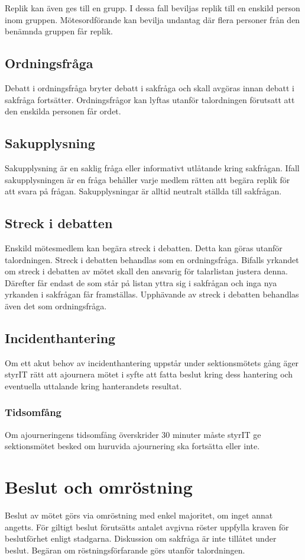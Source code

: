 \documentclass[11pt, includeaddress]{classes/cthit}
\begin{document}
Replik kan även ges till en grupp. I dessa fall beviljas replik till en enskild person inom gruppen.
Mötesordförande kan bevilja undantag där flera personer från den benämnda gruppen får replik.

\subsection{Ordningsfråga}
Debatt i ordningsfråga bryter debatt i sakfråga och skall avgöras innan debatt i sakfråga fortsätter.
Ordningsfrågor kan lyftas utanför talordningen förutsatt att den enskilda personen får ordet.
\subsection{Sakupplysning}
Sakupplysning är en saklig fråga eller informativt utlåtande kring sakfrågan. Ifall sakupplysningen är en fråga behåller varje medlem rätten att begära replik för att svara på frågan.
Sakupplysningar är alltid neutralt ställda till sakfrågan.
\subsection{Streck i debatten}
Enskild mötesmedlem kan begära streck i debatten.
Detta kan göras utanför talordningen.
Streck i debatten behandlas som en ordningsfråga. Bifalls yrkandet om streck i debatten av mötet skall den ansvarig för talarlistan justera denna.
Därefter får endast de som står på listan yttra sig i sakfrågan och inga nya yrkanden i sakfrågan får framställas.
Upphävande av streck i debatten behandlas även det som ordningsfråga.
\subsection{Incidenthantering}
Om ett akut behov av incidenthantering uppstår under sektionsmötets gång äger styrIT rätt att ajournera mötet i syfte att fatta beslut kring dess hantering och eventuella uttalande kring hanterandets resultat.
\subsubsection{Tidsomfång}
Om ajourneringens tidsomfång överskrider 30 minuter måste styrIT ge sektionsmötet besked om huruvida ajournering ska fortsätta eller inte.
\section{Beslut och omröstning}
Beslut av mötet görs via omröstning med enkel majoritet, om inget annat angetts. För giltigt beslut förutsätts antalet avgivna röster uppfylla kraven för beslutförhet enligt stadgarna. Diskussion om sakfråga är inte tillåtet under beslut. Begäran om röstningsförfarande görs utanför talordningen.
\end{document}
